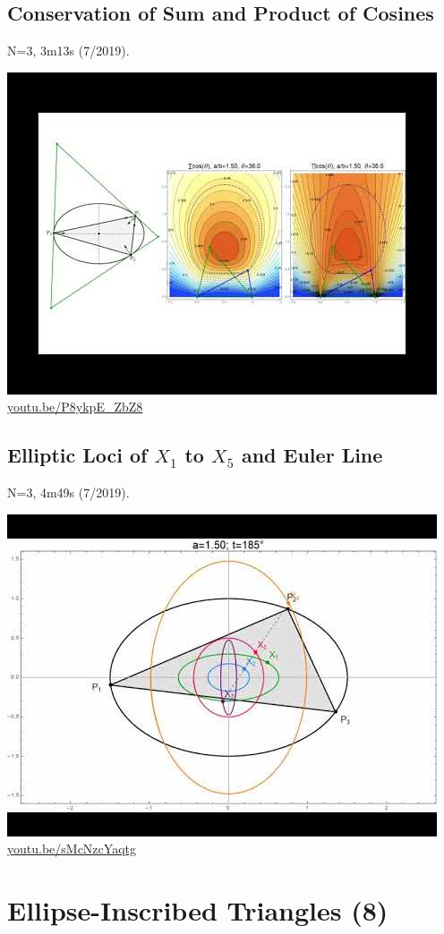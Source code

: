 \documentclass[12pt]{amsart}
\begin{document}
\subsection{Conservation of Sum and Product of Cosines}
\label{vid:P8ykpE_ZbZ8}
\noindent N=3, 3m13s (7/2019). 
\begin{center}\includegraphics[width=.5\textwidth]{pics/P8ykpE_ZbZ8.jpg} \\ 
\href{https://youtu.be/P8ykpE_ZbZ8}{\url{youtu.be/P8ykpE\_ZbZ8}}\end{center}
% 
\subsection{Elliptic Loci of $X_{1}$ to $X_{5}$ and Euler Line}
\label{vid:sMcNzcYaqtg}
\noindent N=3, 4m49s (7/2019). 
\begin{center}\includegraphics[width=.5\textwidth]{pics/sMcNzcYaqtg.jpg} \\ 
\href{https://youtu.be/sMcNzcYaqtg}{\url{youtu.be/sMcNzcYaqtg}}\end{center}
% 

\section{Ellipse-Inscribed Triangles (8)}
\end{document}
